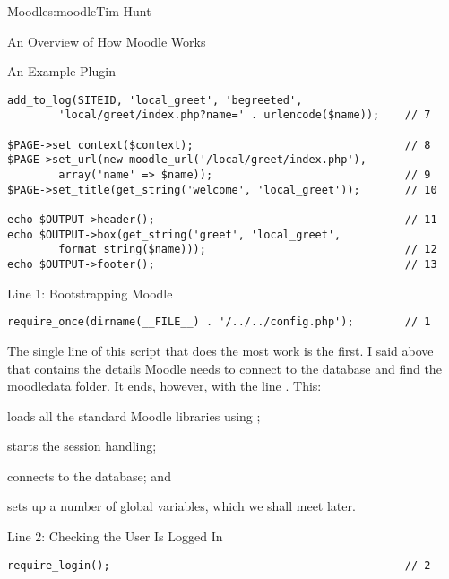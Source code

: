 \begin{aosachapter}{Moodle}{s:moodle}{Tim Hunt}
\begin{aosasect1}{An Overview of How Moodle Works}
\begin{aosasect2}{An Example Plugin}
\begin{verbatim}
add_to_log(SITEID, 'local_greet', 'begreeted',
        'local/greet/index.php?name=' . urlencode($name));    // 7

$PAGE->set_context($context);                                 // 8
$PAGE->set_url(new moodle_url('/local/greet/index.php'),
        array('name' => $name));                              // 9
$PAGE->set_title(get_string('welcome', 'local_greet'));       // 10

echo $OUTPUT->header();                                       // 11
echo $OUTPUT->box(get_string('greet', 'local_greet',
        format_string($name)));                               // 12
echo $OUTPUT->footer();                                       // 13
\end{verbatim}

\end{aosasect2}

\begin{aosasect2}{Line 1: Bootstrapping Moodle}

\begin{verbatim}
require_once(dirname(__FILE__) . '/../../config.php');        // 1
\end{verbatim}

The single line of this script that does the most work is the first. I
said above that  contains the details Moodle needs to
connect to the database and find the moodledata folder. It ends,
however, with the line . This:

\begin{aosaenumerate}

\item loads all the standard Moodle libraries using
  ;

\item starts the session handling;

\item connects to the database; and

\item sets up a number of global variables, which we shall meet later.

\end{aosaenumerate}

\end{aosasect2}

\begin{aosasect2}{Line 2: Checking the User Is Logged In}

\begin{verbatim}
require_login();                                              // 2
\end{verbatim}


\end{aosasect2}
\end{aosasect1}
\end{aosachapter}
